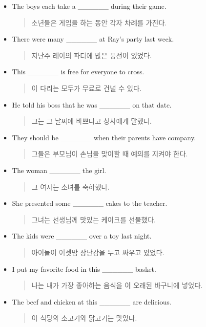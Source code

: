 \documentclass{article}
\begin{document}
\begin{addmargin}[1em]{1em}
\begin{itemize}
    \item The boys each take a \_\_\_\_\_\_ during their game.
    \begin{quote}
    소년들은 게임을 하는 동안 각자 차례를 가진다.
    \end{quote}
    \item There were many \_\_\_\_\_\_ at Ray's party last week.
    \begin{quote}
    지난주 레이의 파티에 많은 풍선이 있었다.
    \end{quote}
    \item This \_\_\_\_\_\_ is free for everyone to cross.
    \begin{quote}
    이 다리는 모두가 무료로 건널 수 있다.
    \end{quote}
    \item He told his boss that he was \_\_\_\_\_\_ on that date.
    \begin{quote}
    그는 그 날짜에 바쁘다고 상사에게 말했다.
    \end{quote}
    \item They should be \_\_\_\_\_\_ when their parents have company.
    \begin{quote}
    그들은 부모님이 손님을 맞이할 때 예의를 지켜야 한다.
    \end{quote}
    \item The woman \_\_\_\_\_\_ the girl.
    \begin{quote}
    그 여자는 소녀를 축하했다.
    \end{quote}
    \item She presented some \_\_\_\_\_\_ cakes to the teacher.
    \begin{quote}
    그녀는 선생님께 맛있는 케이크를 선물했다.
    \end{quote}
    \item The kids were \_\_\_\_\_\_ over a toy last night.
    \begin{quote}
    아이들이 어젯밤 장난감을 두고 싸우고 있었다.
    \end{quote}
    \item I put my favorite food in this \_\_\_\_\_\_ basket.
    \begin{quote}
    나는 내가 가장 좋아하는 음식을 이 오래된 바구니에 넣었다.
    \end{quote}
    \item The beef and chicken at this \_\_\_\_\_\_ are delicious.
    \begin{quote}
    이 식당의 소고기와 닭고기는 맛있다.
    \end{quote}

\end{itemize}
\end{addmargin}
\end{document}
